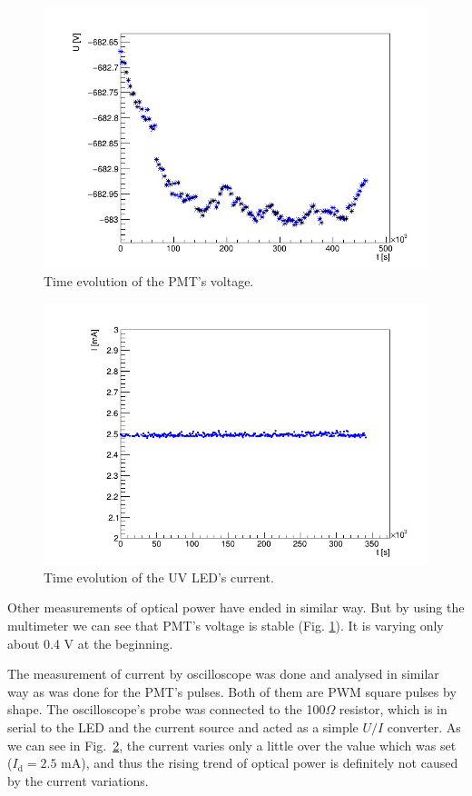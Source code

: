 \begin{figure}[H]
 \centering
 \includegraphics[scale=0.5]{./pictures/voltage}
 \caption{Time evolution of the PMT's voltage.}
 \label{PMTVolt}
\end{figure}

\begin{figure}[H]
 \centering
 \includegraphics[scale=0.5]{./pictures/Current}
 \caption{Time evolution of the UV LED's current.}
 \label{LEDCurrent}
\end{figure}

Other measurements of optical power have ended in similar way. But by using the multimeter we can see that PMT's voltage is stable (Fig. \ref{PMTVolt}). It is varying only about 0.4 V at the beginning.
\par
The measurement of current by oscilloscope was done and analysed in similar way as was done for the PMT's pulses. Both of them are PWM square pulses by shape. The oscilloscope's probe was connected to the 100$\Omega$ resistor, which is in serial to the LED and the current source and acted as a simple $U/I$ converter. As we can see in Fig.~\ref{LEDCurrent}, the current varies only a little over the value which was set ($I_\textrm{d} = 2.5$ mA), and thus the rising trend of optical power is definitely not caused by the current variations.

